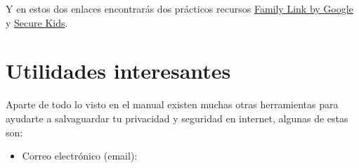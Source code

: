 \documentclass[
  spanish,
  a4paper,
  openany]{book}
\begin{document}
Y en estos dos enlaces encontrarás dos prácticos recursos \href{https://families.google.com/familylink/}{Family Link by Google} y \href{https://securekids.es/}{Secure Kids}.

\hypertarget{utilidades-interesantes}{%
\section{Utilidades interesantes}\label{utilidades-interesantes}}

Aparte de todo lo visto en el manual existen muchas otras herramientas para ayudarte a salvaguardar tu privacidad y seguridad en internet, algunas de estas son:

\begin{itemize}
\item
  Correo electrónico (email):


\end{itemize}
\end{document}
